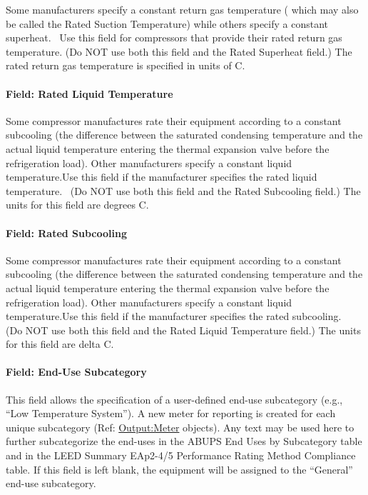 Some manufacturers specify a constant return gas temperature ( which may also be called the Rated Suction Temperature) while others specify a constant superheat.~ Use this field for compressors that provide their rated return gas temperature. (Do NOT use both this field and the Rated Superheat field.) The rated return gas temperature is specified in units of C.

\paragraph{Field: Rated Liquid Temperature}\label{field-rated-liquid-temperature}

Some compressor manufactures rate their equipment according to a constant subcooling (the difference between the saturated condensing temperature and the actual liquid temperature entering the thermal expansion valve before the refrigeration load). Other manufacturers specify a constant liquid temperature.Use this field if the manufacturer specifies the rated liquid temperature.~ (Do NOT use both this field and the Rated Subcooling field.) The units for this field are degrees C.

\paragraph{Field: Rated Subcooling}\label{field-rated-subcooling}

Some compressor manufactures rate their equipment according to a constant subcooling (the difference between the saturated condensing temperature and the actual liquid temperature entering the thermal expansion valve before the refrigeration load). Other manufacturers specify a constant liquid temperature.Use this field if the manufacturer specifies the rated subcooling.~ (Do NOT use both this field and the Rated Liquid Temperature field.) The units for this field are delta C.

\paragraph{Field: End-Use Subcategory}\label{field-end-use-subcategory-3-001}

This field allows the specification of a user-defined end-use subcategory (e.g., ``Low Temperature System''). A new meter for reporting is created for each unique subcategory (Ref: \hyperref[outputmeter-and-outputmetermeterfileonly]{Output:Meter} objects). Any text may be used here to further subcategorize the end-uses in the ABUPS End Uses by Subcategory table and in the LEED Summary EAp2-4/5 Performance Rating Method Compliance table.  If this field is left blank, the equipment will be assigned to the ``General'' end-use subcategory.

